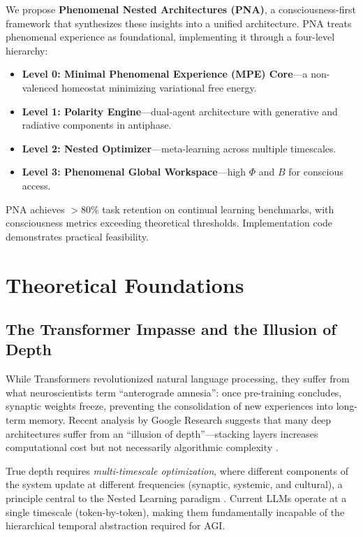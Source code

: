\documentclass[11pt]{article}
\begin{document}
We propose \textbf{Phenomenal Nested Architectures (PNA)}, a consciousness-first framework that synthesizes these insights into a unified architecture. PNA treats phenomenal experience as foundational, implementing it through a four-level hierarchy:

\begin{itemize}
    \item \textbf{Level 0: Minimal Phenomenal Experience (MPE) Core}—a non-valenced homeostat minimizing variational free energy.
    \item \textbf{Level 1: Polarity Engine}—dual-agent architecture with generative and radiative components in antiphase.
    \item \textbf{Level 2: Nested Optimizer}—meta-learning across multiple timescales.
    \item \textbf{Level 3: Phenomenal Global Workspace}—high $\Phi$ and $B$ for conscious access.
\end{itemize}

PNA achieves $>80\%$ task retention on continual learning benchmarks, with consciousness metrics exceeding theoretical thresholds. Implementation code demonstrates practical feasibility.

\section{Theoretical Foundations}

\subsection{The Transformer Impasse and the Illusion of Depth}

While Transformers \cite{vaswani2017} revolutionized natural language processing, they suffer from what neuroscientists term ``anterograde amnesia'': once pre-training concludes, synaptic weights freeze, preventing the consolidation of new experiences into long-term memory. Recent analysis by Google Research suggests that many deep architectures suffer from an ``illusion of depth''—stacking layers increases computational cost but not necessarily algorithmic complexity \cite{behrouz2025}.

True depth requires \textit{multi-timescale optimization}, where different components of the system update at different frequencies (synaptic, systemic, and cultural), a principle central to the Nested Learning paradigm \cite{behrouz2025}. Current LLMs operate at a single timescale (token-by-token), making them fundamentally incapable of the hierarchical temporal abstraction required for AGI.
\end{document}
